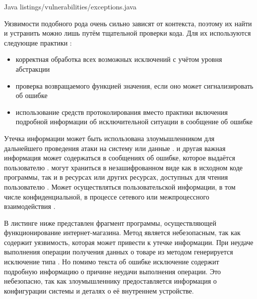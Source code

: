 	{Java}
	{listings/vulnerabilities/exceptions.java}

%
Уязвимости подобного рода очень сильно зависят от контекста, поэтому их найти и устранить можно лишь путём тщательной проверки кода. 
%
Для их  используются следующие практики : 
\begin{itemize}
	
	\item корректная обработка всех возможных исключений с учётом уровня абстракции 
	
	\item проверка возвращаемого функцией значения, если оно может сигнализировать об ошибке 
	
	\item использование средств протоколирования вместо практики включения подробной информации об исключительной ситуации в сообщение об ошибке 
\end{itemize}



%
Утечка информации может быть использована злоумышленником для дальнейшего проведения атаки на систему или данные . 
%
 и другая важная информация может содержаться в сообщениях об ошибке, которое выдаётся пользователю . 
%
 могут храниться в незашифрованном виде как в исходном коде программы, так и в ресурсах или других ресурсах, доступных для чтения пользователю . 
%
Может осуществляться  пользовательской  информации, в том числе конфиденциальной, в процессе сетевого или межпроцессного взаимодействия .

%
В листинге ниже представлен фрагмент программы, осуществляющей функционирование интернет-магазина. 
%
Метод  является небезопасным, так как содержит уязвимость, которая может привести к утечке информации.
%
При неудаче выполнения операции получения данных о товаре из  методом генерируется исключение типа . 
%
Но помимо текста об ошибке исключение содержит подробную информацию о причине неудачи выполнения операции. 
%
Это небезопасно, так как злоумышленнику предоставляется информация о конфигурации системы и деталях о её внутреннем устройстве. 

